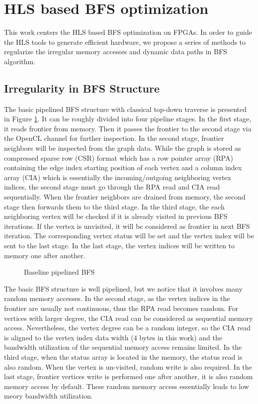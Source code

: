 \section{HLS based BFS optimization} \label{sec:bfs-opt}
This work centers the HLS based BFS optimization on FPGAs. 
In order to guide the HLS tools to generate efficient hardware, 
we propose a series of methods to regularize the irregular memory 
accesses and dynamic data paths in BFS algorithm. 

\subsection{Irregularity in BFS Structure}
The basic pipelined BFS structure with classical top-down traverse 
is presented in Figure \ref{fig:base-bfs}. It can be roughly 
divided into four pipeline stages. In the first stage, it reads 
frontier from memory. Then it passes the frontier to the second stage
via the OpenCL channel for further inspection. In the second stage, 
frontier neighbors will be inspected from the graph data. While the 
graph is stored as compressed sparse row (CSR) format which has a row 
pointer array (RPA) containing the edge index starting position of each 
vertex and a column index array (CIA) which is essentially the incoming/outgoing 
neighboring vertex indices, the second stage must go through the RPA read and 
CIA read sequentially. When the frontier neighbors are 
drained from memory, the second stage then forwards them to the third stage.
In the third stage, the each neighboring vertex will be checked if it is 
already visited in previous BFS iterations. If the vertex is unvisited, 
it will be considered as frontier in next BFS iteration. The corresponding 
vertex status will be set and the vertex index will be sent to the last stage.
In the last stage, the vertex indices will be written to memory one 
after another.

\begin{figure}
    \caption{Baseline pipelined BFS}
\label{fig:base-bfs}
\end{figure}

The basic BFS structure is well pipelined, but we notice that it involves many 
random memory accesses. In the second stage, as the vertex indices in the frontier 
are usually not continuous, thus the RPA read becomes random. For vertices with 
larger degree, the CIA read can be considered as sequential memory access. Nevertheless, 
the vertex degree can be a random integer, so the CIA read is aligned to 
the vertex index data width (4 bytes in this work) and the bandwidth utilization of 
the sequential memory access remains limited. In the third stage, when the status array 
is located in the memory, the status read is also random. When the vertex is un-visited, 
random write is also required. In the last stage, frontier vertices write is performed one 
after another, it is also random memory access by default. These random memory access 
essentially leads to low meory bandwidth utilization. 

